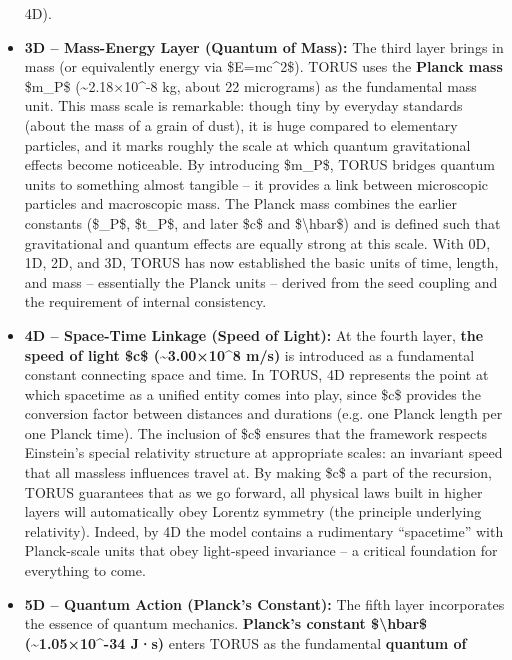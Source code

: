 \documentclass[
]{article}
\begin{document}
\begin{itemize}
  4D).
\item
  \textbf{3D -- Mass-Energy Layer (Quantum of Mass):} The third layer
  brings in mass (or equivalently energy via \$E=mc\^{}2\$). TORUS uses
  the \textbf{Planck mass} \$m\_P\$ (\textasciitilde2.18×10\^{}-8 kg,
  about 22 micrograms) as the fundamental mass unit\hspace{0pt}. This
  mass scale is remarkable: though tiny by everyday standards (about the
  mass of a grain of dust), it is huge compared to elementary particles,
  and it marks roughly the scale at which quantum gravitational effects
  become noticeable. By introducing \$m\_P\$, TORUS bridges quantum
  units to something almost tangible -- it provides a link between
  microscopic particles and macroscopic mass. The Planck mass combines
  the earlier constants (\$\ell\_P\$, \$t\_P\$, and later \$c\$ and
  \$\textbackslash hbar\$) and is defined such that gravitational and
  quantum effects are equally strong at this scale. With 0D, 1D, 2D, and
  3D, TORUS has now established the basic units of time, length, and
  mass -- essentially the Planck units -- derived from the seed coupling
  and the requirement of internal consistency.
\item
  \textbf{4D -- Space-Time Linkage (Speed of Light):} At the fourth
  layer, \textbf{the speed of light \$c\$ (\textasciitilde3.00×10\^{}8
  m/s)} is introduced as a fundamental constant connecting space and
  time\hspace{0pt}. In TORUS, 4D represents the point at which spacetime
  as a unified entity comes into play, since \$c\$ provides the
  conversion factor between distances and durations (e.g. one Planck
  length per one Planck time). The inclusion of \$c\$ ensures that the
  framework respects Einstein's special relativity structure at
  appropriate scales: an invariant speed that all massless influences
  travel at. By making \$c\$ a part of the recursion, TORUS guarantees
  that as we go forward, all physical laws built in higher layers will
  automatically obey Lorentz symmetry (the principle underlying
  relativity). Indeed, by 4D the model contains a rudimentary
  ``spacetime'' with Planck-scale units that obey light-speed invariance
  -- a critical foundation for everything to come.
\item
  \textbf{5D -- Quantum Action (Planck's Constant):} The fifth layer
  incorporates the essence of quantum mechanics. \textbf{Planck's
  constant \$\textbackslash hbar\$ (\textasciitilde1.05×10\^{}-34 J·s)}
  enters TORUS as the fundamental \textbf{quantum of
}
\end{itemize}
\end{document}
